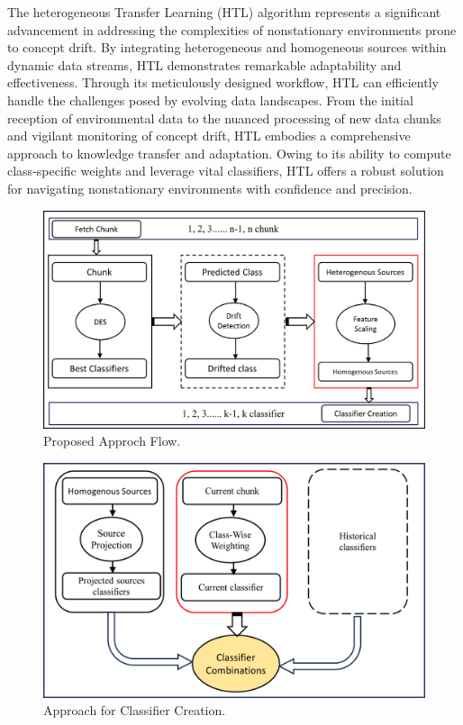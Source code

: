 The heterogeneous Transfer Learning (HTL) algorithm represents a significant advancement in addressing the complexities of nonstationary environments prone to concept drift. By integrating heterogeneous and homogeneous sources within dynamic data streams, HTL demonstrates remarkable adaptability and effectiveness. Through its meticulously designed workflow, HTL can efficiently handle the challenges posed by evolving data landscapes. From the initial reception of environmental data to the nuanced processing of new data chunks and vigilant monitoring of concept drift, HTL embodies a comprehensive approach to knowledge transfer and adaptation. Owing to its ability to compute class-specific weights and leverage vital classifiers, HTL offers a robust solution for navigating nonstationary environments with confidence and precision.


\begin{figure}[!ht]
	\centering
	\includegraphics[width=1\linewidth]{6_transfer_learning/figures/alg1.png}
	\caption{Proposed Approch Flow.}
	\label{fig:6_alg1}
\end{figure}
\begin{figure}[!ht]
	\centering
	\includegraphics[width=1\linewidth]{6_transfer_learning/figures/alg2.png}
	\caption{Approach for Classifier Creation.}
	\label{fig:6_alg2}
\end{figure}

